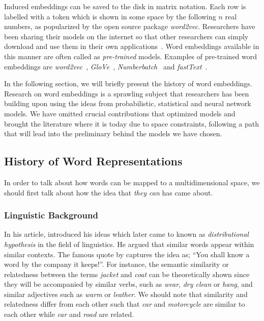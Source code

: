 Induced embeddings can be saved to the disk in matrix notation.
Each row is labelled with a token which is shown in some space by the following $n$ real numbers, as popularized by the open source package \emph{word2vec}.
Researchers have been sharing their models on the internet so that other researchers can simply download and use them in their own applications~\cite{balikasCrosslingual2018, kusnerWord2015, speer_conceptnet_2017}.
Word embeddings available in this manner are often called as \emph{pre-trained} models.
Examples of pre-trained word embeddings are \emph{word2vec}~\cite{mikolovDistributed2013}, \emph{GloVe}~\cite{pennington_glove_2014}, \emph{Numberbatch}~\cite{speer_conceptnet_2017} and \emph{fastText}~\cite{bojanowskiEnriching2016a}.

In the following section, we will briefly present the history of word embeddings.
Research on word embeddings is a sprawling subject that researchers has been building upon using the ideas from probabilistic, statistical and neural network models.
We have omitted crucial contributions that optimized models and brought the literature where it is today due to space constraints, following a path that will lead into the preliminary behind the models we have chosen.

\subsection{History of Word Representations}%
\label{sub:history_of_word_representations}

In order to talk about how words can be mapped to a multidimensional space, we should first talk about how the idea that \emph{they can} has came about.

\subsubsection{Linguistic Background}%
\label{ssub:linguistic_background}

In his \citeyear{harris_distributional_1954} article, \textcite{harris_distributional_1954} introduced his ideas which later came to known as \emph{distributional hypothesis} in the field of linguistics.
He argued that similar words appear within similar contexts.
The famous quote by \textcite{firth_synopsis_1957} captures the idea as; \enquote{You shall know a word by the company it keeps!}.
For instance, the semantic similarity or relatedness between the terms \emph{jacket} and \emph{coat} can be theoretically shown since they will be accompanied by similar verbs, such as \emph{wear}, \emph{dry clean} or \emph{hang}, and similar adjectives such as \emph{warm} or \emph{leather}.
We should note that similarity and relatedness differ from each other such that \emph{car} and \emph{motorcycle} are similar to each other while \emph{car} and \emph{road} are related.

